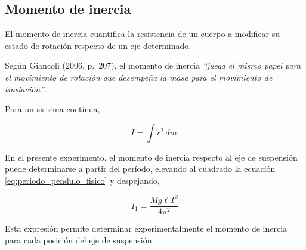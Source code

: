 \documentclass[11pt,a4paper]{article}
\newenvironment{subsectionbody}
{%
    \begin{list}{}{%
        \setlength{\leftmargin}{0.6cm}%
        \setlength{\rightmargin}{0cm}%
        \setlength{\topsep}{0pt}%
        \setlength{\partopsep}{0pt}%
        \setlength{\parsep}{0pt}%
        \setlength{\itemsep}{0pt}%
    }%
    \item\relax
}
{%
    \end{list}
}
\begin{document}
\subsection{Momento de inercia}
\begin{subsectionbody}

El momento de inercia cuantifica la resistencia de un cuerpo a
modificar su estado de rotación respecto de un eje determinado.

Según Giancoli (2006, p.~207), el momento de inercia
\textit{``juega el mismo papel para el movimiento de rotación que
desempeña la masa para el movimiento de traslación''}.

Para un sistema continua,

\[
I=\int r^2\,dm.
\]

En el presente experimento, el momento de inercia respecto al eje de
suspensión puede determinarse a partir del período, elevando al cuadrado
la ecuación \eqref{eq:periodo_pendulo_fisico} y despejando,

\begin{equation}
\boxed{
I_1=\frac{Mg\ell T^2}{4\pi^2}
}
\label{eq:momento_experimental}
\end{equation}

Esta expresión permite determinar experimentalmente el momento de
inercia para cada posición del eje de suspensión.
\end{subsectionbody}
\end{document}
